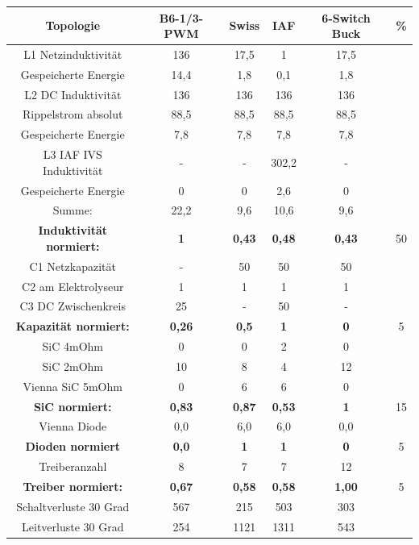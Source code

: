 \begin{table}
	\label{An:Entscheidungsmatrix}

\begin{tabular}{|c|c|c|c|c|c|}
	\hline
	Topologie & B6-1/3-PWM & Swiss & IAF & 6-Switch Buck & \% \\
	\hline
	L1 Netzinduktivität & 136 & 17,5 & 1 & 17,5 &\\
	\hline
	Gespeicherte Energie & 14,4 & 1,8 & 0,1 & 1,8 &\\
	\hline
	L2 DC Induktivität  & 136 & 136 & 136 & 136 &\\
	\hline
	Rippelstrom absolut & 88,5 & 88,5 & 88,5 & 88,5& \\
	\hline
	Gespeicherte Energie & 7,8 & 7,8 & 7,8 & 7,8 &\\
	\hline
	L3 IAF IVS Induktivität & - & - & 302,2 & - &\\
	\hline
	Gespeicherte Energie  & 0 & 0 & 2,6 & 0 &\\
	\hline
	Summe: & 22,2 & 9,6 & 10,6 & 9,6 &\\
	\hline
	\bfseries Induktivität normiert: & \bfseries 1 &\bfseries 0,43 &\bfseries 0,48 &\bfseries 0,43 & 50\\
	\hline
	C1 Netzkapazität & - & 50 & 50 & 50& \\
	\hline
	C2 am Elektrolyseur & 1 & 1 & 1 & 1 &\\
	\hline
	C3 DC Zwischenkreis & 25 & - & 50 & - &\\
	\hline
	\bfseries Kapazität normiert: &\bfseries 0,26 &\bfseries 0,5 &\bfseries 1 &\bfseries 0 &5\\
	\hline
	SiC 4mOhm & 0 & 0 & 2 & 0 &\\
	\hline
	SiC 2mOhm & 10 & 8 & 4 & 12 &\\
	\hline
	Vienna SiC 5mOhm & 0 & 6 & 6 & 0 &\\
	\hline
	\bfseries SiC normiert: &\bfseries 0,83 &\bfseries 0,87 &\bfseries 0,53 &\bfseries 1 &15\\
	\hline
	Vienna Diode & 0,0 & 6,0 & 6,0 & 0,0& \\
	\hline
	\bfseries Dioden normiert &\bfseries 0,0 & \bfseries1 &\bfseries 1 &\bfseries 0&5 \\
	\hline
	Treiberanzahl & 8 & 7 & 7 & 12 &\\
	\hline
	\bfseries Treiber normiert: &\bfseries 0,67 &\bfseries 0,58 &\bfseries 0,58 &\bfseries 1,00& 5\\
	\hline
	Schaltverluste 30 Grad & 567 & 215 & 503 & 303 &\\
	\hline
	Leitverluste 30 Grad & 254 & 1121 & 1311 & 543 &\\

\end{tabular}
\end{table}
